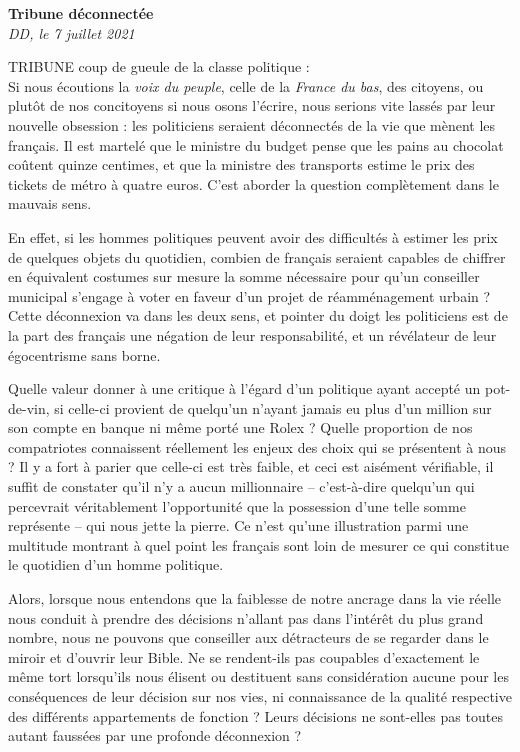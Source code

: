 \documentclass[french,12pt,amstex,a4paper]{article}
\begin{document}
\begin{center}
{\bf Tribune déconnectée}\\
{\it DD, le 7 juillet 2021}\\
\end{center}

TRIBUNE coup de gueule de la classe politique :\\

Si nous écoutions la {\it voix du peuple}, celle de la {\it France du bas}, des citoyens, ou plutôt de nos concitoyens si nous osons l'écrire, nous serions vite lassés par leur nouvelle obsession : les politiciens seraient déconnectés de la vie que mènent les français. Il est martelé que le ministre du budget pense que les pains au chocolat coûtent quinze centimes, et que la ministre des transports estime le prix des tickets de métro à quatre euros. C'est aborder la question complètement dans le mauvais sens.

En effet, si les hommes politiques peuvent avoir des difficultés à estimer les prix de quelques objets du quotidien, combien de français seraient capables de chiffrer en équivalent costumes sur mesure la somme nécessaire pour qu'un conseiller municipal s'engage à voter en faveur d'un projet de réamménagement urbain ? Cette déconnexion va dans les deux sens, et pointer du doigt les politiciens est de la part des français une négation de leur responsabilité, et un révélateur de leur égocentrisme sans borne.

Quelle valeur donner à une critique à l'égard d'un politique ayant accepté un pot-de-vin, si celle-ci provient de quelqu'un n'ayant jamais eu plus d'un million sur son compte en banque ni même porté une Rolex ? Quelle proportion de nos compatriotes connaissent réellement les enjeux des choix qui se présentent à nous ? Il y a fort à parier que celle-ci est très faible, et ceci est aisément vérifiable, il suffit de constater qu'il n'y a aucun millionnaire -- c'est-à-dire quelqu'un qui percevrait véritablement l'opportunité que la possession d'une telle somme représente -- qui nous jette la pierre. Ce n'est qu'une illustration parmi une multitude montrant à quel point les français sont loin de mesurer ce qui constitue le quotidien d'un homme politique.

Alors, lorsque nous entendons que la faiblesse de notre ancrage dans la vie réelle nous conduit à prendre des décisions n'allant pas dans l'intérêt du plus grand nombre, nous ne pouvons que conseiller aux détracteurs de se regarder dans le miroir et d'ouvrir leur Bible. Ne se rendent-ils pas coupables d'exactement le même tort lorsqu'ils nous élisent ou destituent sans considération aucune pour les conséquences de leur décision sur nos vies, ni connaissance de la qualité respective des différents appartements de fonction ? Leurs décisions ne sont-elles pas toutes autant faussées par une profonde déconnexion ?
\end{document}
